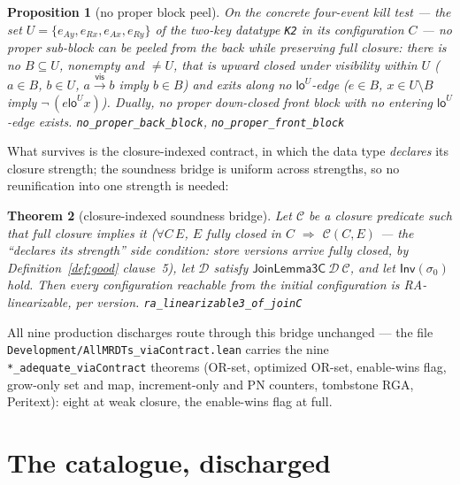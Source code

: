 \documentclass[11pt]{article}
\newtheorem{theorem}{Theorem}[section]
\newtheorem{proposition}[theorem]{Proposition}
\newcommand{\vis}{\xrightarrow{\mathsf{vis}}}
\newcommand{\Sinit}{\sigma_0}
\newcommand{\loE}[1]{\mathsf{lo}^{#1}}
\newcommand{\lean}[1]{\texttt{#1}}
\newcommand{\M}[1]{\mathcal{#1}}
\newcommand{\Inv}{\mathsf{Inv}}
\begin{document}
\begin{proposition}[no proper block peel]
\label{prop:noblock}
On the concrete four-event kill test --- the set
$U = \{e_{Ay}, e_{Rx}, e_{Ax}, e_{Ry}\}$ of the two-key datatype
\lean{K2} in its configuration $C$ --- no proper sub-block can be
peeled from the back while preserving full closure: there is no
$B \subseteq U$, nonempty and $\neq U$, that is upward closed under
visibility within $U$
($a \in B$, $b \in U$, $a \vis b$ imply $b \in B$) and exits along no
$\loE{U}$-edge
($e \in B$, $x \in U \setminus B$ imply
$\neg\,(e \mathrel{\loE{U}} x)$). Dually, no proper down-closed front
block with no entering $\loE{U}$-edge exists.
\hfill\lean{no\_proper\_back\_block}, \lean{no\_proper\_front\_block}
\end{proposition}

What survives is the closure-indexed contract, in which the data type
\emph{declares} its closure strength; the soundness bridge is uniform
across strengths, so no reunification into one strength is needed:

\begin{theorem}[closure-indexed soundness bridge]
\label{thm:joinc}
Let $\mathcal{C}$ be a closure predicate such that full closure implies
it ($\forall C\, E$, $E$ fully closed in $C$ $\Rightarrow$
$\mathcal{C}(C, E)$ --- the ``declares its strength'' side condition:
store versions arrive fully closed, by Definition~\ref{def:good}
clause~5), let $\M{D}$ satisfy
$\mathsf{JoinLemma3C}\ \M{D}\ \mathcal{C}$, and let $\Inv(\Sinit)$
hold. Then every configuration reachable from the initial configuration
is RA-linearizable, per version.
\hfill\lean{ra\_linearizable3\_of\_joinC}
\end{theorem}

All nine production discharges route through this bridge unchanged ---
the file \lean{Development/AllMRDTs\_viaContract.lean} carries the nine
\lean{*\_adequate\_viaContract} theorems (OR-set, optimized OR-set,
enable-wins flag, grow-only set and map, increment-only and PN
counters, tombstone RGA, Peritext): eight at weak closure, the
enable-wins flag at full.

\section{The catalogue, discharged}
\label{sec:catalog}
\end{document}
